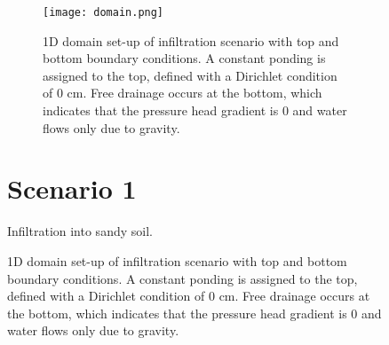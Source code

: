 \documentclass[
10pt, %
a4paper, %
oneside, %
headinclude,footinclude, %
BCOR5mm, %
]{scrartcl}
\begin{document}
\begin{figure}[!h]


\begin{figure}[!h]
\centering
\texttt{[image: domain.png]}
\caption{1D domain set-up of infiltration scenario with top and bottom boundary conditions. A constant ponding is assigned to the top, defined with a Dirichlet condition of 0 cm. Free drainage occurs at the bottom, which indicates that the pressure head gradient is 0 and water flows only due to gravity.}
\end{figure}

\newpage

\section*{Scenario 1}

Infiltration into sandy soil. 


\end{figure}
\end{document}
